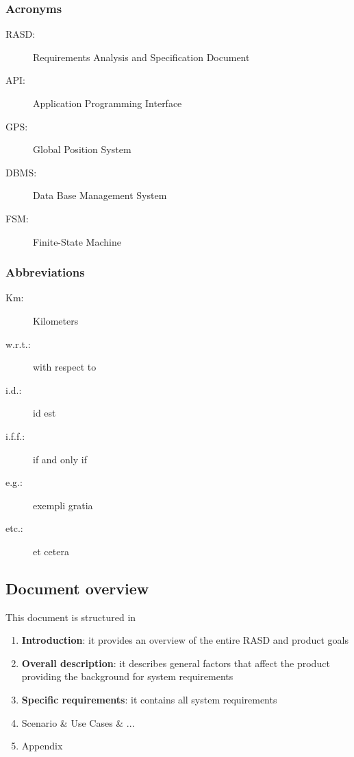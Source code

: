 \subsubsection{Acronyms}
	\begin{description}
		\item [RASD:] Requirements Analysis and Specification Document
		\item [API:] Application Programming Interface
		\item [GPS:] Global Position System
		\item [DBMS:] Data Base Management System
		\item [FSM:] Finite-State Machine
	\end{description}
\subsubsection{Abbreviations}
	\begin{description}
		\item [Km:] Kilometers
		\item [w.r.t.:] with respect to
		\item [i.d.:] id est
		\item [i.f.f.:] if and only if
		\item [e.g.:] exempli gratia
		\item [etc.:] et cetera
	\end{description}

\subsection{Document overview}
This document is structured in 
\begin{enumerate}
	\item \textbf{Introduction}: it provides an overview of the entire RASD and product goals
	\item \textbf{Overall description}: it describes general factors that affect the product providing the background for system requirements
	\item \textbf{Specific requirements}: it contains all system requirements
	\item Scenario \& Use Cases \& ...
	\item Appendix
\end{enumerate}